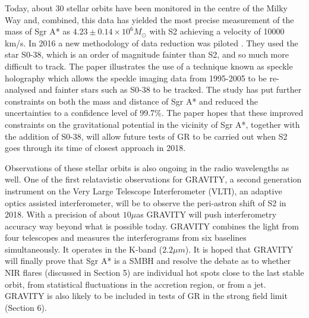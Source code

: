 \documentclass[a4paper,12pt]{article}
\begin{document}
Today, about 30 stellar orbits have been monitored in the centre of the Milky Way and, combined, this data has yielded the most precise measurement of the mass of Sgr A* as 
$4.23\pm0.14\times10^6 M_{\odot}$ \citep{goddi} with S2 achieving a velocity of 10000 km/s. In 2016 a new methodology of data reduction was piloted \citep{boehle}. They used the star S0-38, which is an
order of magnitude fainter than S2, and so much more difficult to track. The paper illustrates the use of a technique known as speckle holography which allows the speckle imaging data from 1995-2005 to
 be
re-analysed and fainter stars such as S0-38 to be tracked. The study has put further constraints on both the mass and distance of Sgr A* and reduced the uncertainties to a confidence level of 99.7\%.
The paper hopes that these improved constraints on the gravitational potential in the vicinity of Sgr A*, together with the addition of S0-38, will allow future tests of GR to be carried out when S2
goes through its time of closest approach in 2018. 

Observations of these stellar orbits is also ongoing in the radio wavelengths as well. One of the first relatavistic observations for GRAVITY, a second generation instrument on the Very Large Telescope
 Interferometer (VLTI), an adaptive
optics assisted interferometer, will be to observe the peri-astron shift of S2 in 2018. With a precision of about $10\mu$as GRAVITY will push interferometry accuracy way beyond what is possible today.
GRAVITY combines the light from four telescopes and measures the interferograms from six baselines simultaneously. It operates in the K-band ($2.2 \mu m$). It is hoped that GRAVITY will finally
prove that Sgr A* is a SMBH and resolve the debate as to whether NIR flares (discussed in Section 5) are individual hot spots close to the last stable orbit, from statistical fluctuations in the 
accretion region, or from a jet. GRAVITY is also likely to be included in tests of GR in the strong field limit (Section 6).
\end{document}

